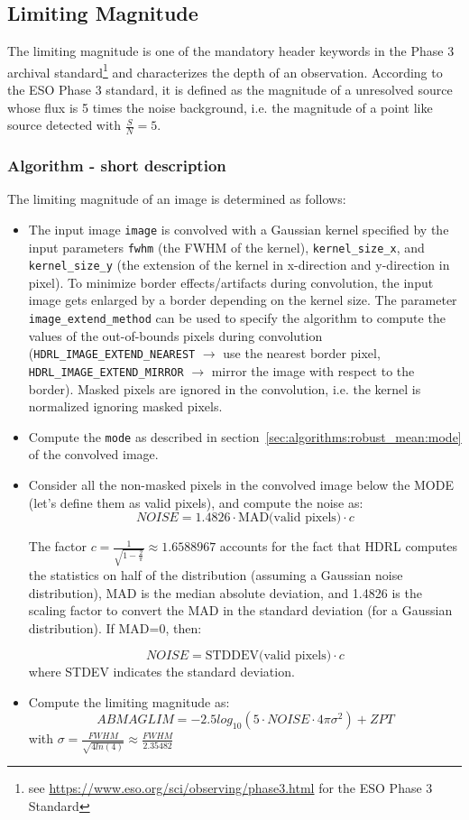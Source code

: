 
\subsection{Limiting Magnitude}
\label{sec:algorithms:maglim:main}

The limiting magnitude is one of the mandatory header keywords in the
Phase 3 archival
standard\footnote{see \url{https://www.eso.org/sci/observing/phase3.html}
for the ESO Phase 3 Standard} and characterizes the depth of an
observation. According to the ESO Phase 3 standard, it is defined as
the magnitude of a unresolved source whose flux is 5 times the noise
background, i.e. the magnitude of a point like source detected with
$\frac{S}{N}=5$.

\subsubsection{Algorithm - short description}
\label{sec:algorithms:maglim:algo}

The limiting magnitude of an image is determined as follows:

\begin{itemize}
\item The input image \verb+image+ is convolved with a Gaussian kernel
  specified by the input parameters \verb+fwhm+ (the FWHM of the
  kernel), \verb+kernel_size_x+, and \verb+kernel_size_y+ (the
  extension of the kernel in x-direction and y-direction in pixel).
  To minimize border effects/artifacts during convolution, the input
  image gets enlarged by a border depending on the kernel size. The
  parameter \verb+image_extend_method+ can be used to specify the
  algorithm to compute the values of the out-of-bounds pixels during
  convolution (\verb+HDRL_IMAGE_EXTEND_NEAREST+ $\rightarrow$ use the
  nearest border pixel, \verb+HDRL_IMAGE_EXTEND_MIRROR+ $\rightarrow$
  mirror the image with respect to the border). Masked pixels are
  ignored in the convolution, i.e. the kernel is normalized ignoring
  masked pixels.
\item Compute the \verb+mode+ as described in
  section~\ref{sec:algorithms:robust_mean:mode} of the convolved
  image.
\item   Consider all the non-masked pixels in the convolved image below the MODE
(let's define them as valid pixels), and compute the noise as:
$$NOISE = 1.4826\cdot\mbox{MAD(valid pixels)}\cdot c$$

  The factor $c = \frac{1}{\sqrt{1-\frac{2}{\pi}}}\approx 1.6588967 $
  accounts for the fact that HDRL computes the statistics on half of the distribution
  (assuming a Gaussian noise distribution), MAD is the median absolute deviation,  and
  1.4826  is  the  scaling  factor to convert the MAD in the standard deviation (for a Gaussian
  distribution).  If MAD=0, then:
  
$$NOISE = \mbox{STDDEV(valid pixels)}\cdot c$$
where STDEV indicates the standard deviation.

\item Compute the limiting magnitude as:
$$ABMAGLIM = -2.5 log_{10}(5\cdot NOISE\cdot 4\pi\sigma^{2})+ZPT$$
with $\sigma = \frac{FWHM}{\sqrt{4 ln(4)}}\approx \frac{FWHM}{2.35482}$
\end{itemize}

